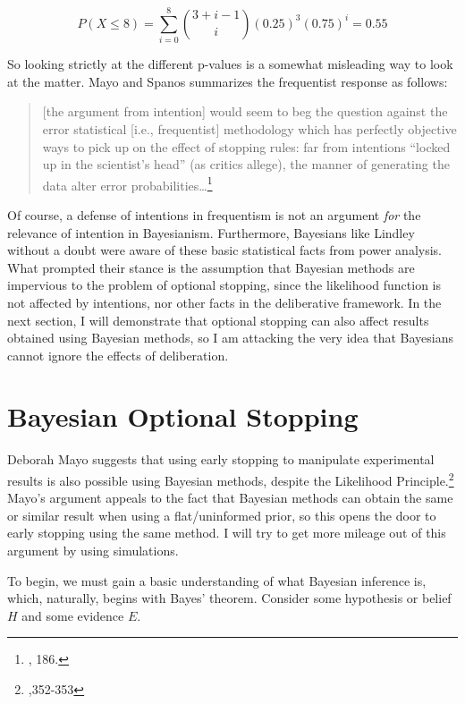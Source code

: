 \[P(X \leq 8) =  \sum_{i=0}^{8} {3+i-1 \choose i} (0.25)^3 (0.75)^{i} =0.55\]

So looking strictly at the different p-values is a somewhat misleading
way to look at the matter. Mayo and Spanos summarizes the frequentist
response as follows:

\begin{quote}
{[}the argument from intention{]} would seem to beg the question against
the error statistical {[}i.e., frequentist{]} methodology which has
perfectly objective ways to pick up on the effect of stopping rules: far
from intentions ``locked up in the scientist's head'' (as critics
allege), the manner of generating the data alter error
probabilities\ldots{}\footnote{\cite{errorstat}, 186.}
\end{quote}

Of course, a defense of intentions in frequentism is not an argument
\emph{for} the relevance of intention in Bayesianism. Furthermore,
Bayesians like Lindley without a doubt were aware of these basic
statistical facts from power analysis. What prompted their stance is the
assumption that Bayesian methods are impervious to the problem of
optional stopping, since the likelihood function is not affected by
intentions, nor other facts in the deliberative framework. In the next
section, I will demonstrate that optional stopping can also affect
results obtained using Bayesian methods, so I am attacking the very idea
that Bayesians cannot ignore the effects of deliberation.





\hypertarget{bayesian-early-stopping}{%
\section{Bayesian Optional
Stopping}\label{ch: bayesian-early-stopping}}

Deborah Mayo suggests that using early stopping to manipulate experimental results is also possible using Bayesian methods, despite  the Likelihood Principle.\footnote{\cite{errorgrowth},352-353} Mayo's argument appeals to the fact that Bayesian methods can obtain the same or similar result when using a flat/uninformed prior, so this opens the door to early stopping using the same method. I will try to get more mileage out of this argument by using simulations.

To begin, we must gain a basic understanding of what Bayesian inference is, which, naturally, begins with Bayes' theorem. Consider some hypothesis
or belief \(H\) and some evidence \(E\).

